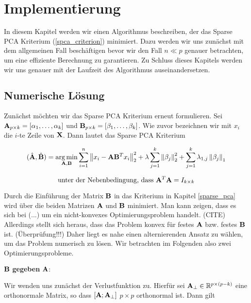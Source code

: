 \chapter{Implementierung}

\label{implementation}

In diesem Kapitel werden wir einen Algorithmus beschreiben, der das Sparse PCA Kriterium (\ref{spca_criterion}) minimiert. Dazu werden wir uns zunächst mit dem allgemeinen Fall beschäftigen bevor wir den Fall $n \ll p$ genauer betrachten, um eine effiziente Berechnung zu garantieren. Zu Schluss dieses Kapitels werden wir uns genauer mit der Laufzeit des Algorithmus auseinandersetzen. 

\section{Numerische Lösung}
\label{spca_numerical_solution}

Zunächst möchten wir das Sparse PCA Kriterium erneut formulieren. Sei $\mathbf{A}_{p \times k} = [ \alpha_1, \ldots ,\alpha_k ]$ und $\mathbf{B}_{p \times k} = [ \beta_1, \ldots ,\beta_k ]$. Wie zuvor bezeichnen wir mit $x_i$ die $i$-te Zeile von $\mathbf{X}$. Dann lautet das Sparse PCA Kriterium

$$(\hat{\mathbf{A}}, \hat{\mathbf{B}}) = \operatorname*{arg\,min}_{\mathbf{A}, \mathbf{B}} \sum_{i=1}^{n} \left\lVert x_i - \mathbf{A}\mathbf{B}^Tx_i \right\rVert_2^2 + \lambda \sum_{j=1}^{k}\left\lVert \beta_j \right\rVert_2^2 + \sum_{j=1}^k \lambda_{1,j} \left\lVert \beta_j \right\rVert_1$$

$$\text{unter der Nebenbedingung, dass } \mathbf{A}^T\mathbf{A} = I_{k \times k}$$

Durch die Einführung der Matrix $\mathbf{B}$ in das Kriterium in Kapitel \ref{sparse_pca} wird über die beiden Matrizen $\mathbf{A}$ und $\mathbf{B}$ minimiert. Man kann zeigen, dass es sich bei (...) um ein nicht-konvexes Optimierungsproblem handelt. (CITE) Allerdings stellt sich heraus, dass das Problem konvex für festes $\mathbf{A}$ bzw. festes $\mathbf{B}$ ist. (Überprüfung!!!) Daher liegt es nahe einen alternierenden Ansatz zu wählen, um das Problem numerisch zu lösen. Wir betrachten im Folgenden also zwei Optimierungsprobleme.

$\mathbf{B}$ \textbf{gegeben} $\mathbf{A}$:

Wir wenden uns zunächst der Verlustfunktion zu. Hierfür sei $\mathbf{A}_{\perp} \in \mathbb{R}^{p \times (p-k)}$ eine orthonormale Matrix, so dass $[\mathbf{A} ; \mathbf{A}_{\perp}]$ $p \times p$ orthonormal ist. Dann gilt

